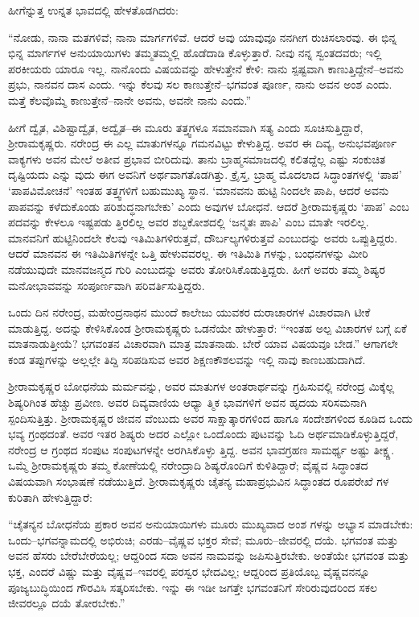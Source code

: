 ಹೀಗೆನ್ನುತ್ತ ಉನ್ನತ ಭಾವದಲ್ಲಿ ಹೇಳತೊಡಗಿದರು:

“ನೋಡು, ನಾನಾ ಮತಗಳಿವೆ; ನಾನಾ ಮಾರ್ಗಗಳಿವೆ. ಆದರೆ ಅವು ಯಾವುವೂ ನನಗೀಗ ರುಚಿಸಲಾರವು. ಈ ಭಿನ್ನ ಭಿನ್ನ ಮಾರ್ಗಗಳ ಅನುಯಾಯಿಗಳು ತಮ್ಮತಮ್ಮಲ್ಲಿ ಹೊಡೆದಾಡಿ ಕೊಳ್ಳುತ್ತಾರೆ. ನೀವು ನನ್ನ ಸ್ವಂತದವರು; ಇಲ್ಲಿ ಪರಕೀಯರು ಯಾರೂ ಇಲ್ಲ. ನಾನೊಂದು ವಿಷಯವನ್ನು ಹೇಳುತ್ತೇನೆ ಕೇಳಿ: ನಾನು ಸ್ಪಷ್ಟವಾಗಿ ಕಾಣುತ್ತಿದ್ದೇನೆ–ಅವನು ಪ್ರಭು, ನಾನವನ ದಾಸ ಎಂದು. ಇನ್ನು ಕೆಲವು ಸಲ ಕಾಣುತ್ತೇನೆ–ಭಗವಂತ ಪೂರ್ಣ, ನಾನು ಅವನ ಅಂಶ ಎಂದು. ಮತ್ತೆ ಕೆಲವೊಮ್ಮೆ ಕಾಣುತ್ತೇನೆ–ನಾನೇ ಅವನು, ಅವನೇ ನಾನು ಎಂದು.”

ಹೀಗೆ ದ್ವೈತ, ವಿಶಿಷ್ಟಾದ್ವೈತ, ಅದ್ವೈತ–ಈ ಮೂರು ತತ್ತ್ವಗಳೂ ಸಮಾನವಾಗಿ ಸತ್ಯ ಎಂದು ಸೂಚಿಸುತ್ತಿದ್ದಾರೆ, ಶ್ರೀರಾಮಕೃಷ್ಣರು. ನರೇಂದ್ರ ಈ ಎಲ್ಲ ಮಾತುಗಳನ್ನೂ ಗಮನವಿಟ್ಟು ಕೇಳುತ್ತಿದ್ದ. ಅವರ ಈ ದಿವ್ಯ, ಅನುಭವಪೂರ್ಣ ವಾಕ್ಯಗಳು ಅವನ ಮೇಲೆ ಅತೀವ ಪ್ರಭಾವ ಬೀರಿದುವು. ತಾನು ಬ್ರಾಹ್ಮಸಮಾಜದಲ್ಲಿ ಕಲಿತದ್ದೆಲ್ಲ ಎಷ್ಟು ಸಂಕುಚಿತ ದೃಷ್ಟಿಯದು ಎನ್ನು ವುದು ಈಗ ಅವನಿಗೆ ಅರ್ಥವಾಗತೊಡಗಿತ್ತು. ಕ್ರೈಸ್ತ, ಬ್ರಾಹ್ಮ ಮೊದಲಾದ ಸಿದ್ಧಾಂತಗಳಲ್ಲಿ ‘ಪಾಪ’ ‘ಪಾಪವಿಮೋಚನೆ’ ಇಂತಹ ತತ್ತ್ವಗಳಿಗೆ ಬಹುಮುಖ್ಯ ಸ್ಥಾನ. ‘ಮಾನವನು ಹುಟ್ಟಿ ನಿಂದಲೇ ಪಾಪಿ, ಆದರೆ ಅವನು ಪಾಪವನ್ನು ಕಳೆದುಕೊಂಡು ಪರಿಶುದ್ಧನಾಗಬೇಕು’ ಎಂದು ಅವುಗಳ ಬೋಧನೆ. ಆದರೆ ಶ್ರೀರಾಮಕೃಷ್ಣರು ‘ಪಾಪ’ ಎಂಬ ಪದವನ್ನು ಕೇಳಲೂ ಇಷ್ಟಪಡು ತ್ತಿರಲಿಲ್ಲ ಅವರ ಶಬ್ದಕೋಶದಲ್ಲಿ ‘ಜನ್ಮತಃ ಪಾಪಿ’ ಎಂಬ ಮಾತೇ ಇರಲಿಲ್ಲ. ಮಾನವನಿಗೆ ಹುಟ್ಟಿನಿಂದಲೇ ಕೆಲವು ಇತಿಮಿತಿಗಳಿರುತ್ತವೆ, ದೌರ್ಬಲ್ಯಗಳಿರುತ್ತವೆ ಎಂಬುದನ್ನು ಅವರು ಒಪ್ಪುತ್ತಿದ್ದರು. ಆದರೆ ಮಾನವನ ಈ ಇತಿಮಿತಿಗಳನ್ನೇ ಒತ್ತಿ ಹೇಳುವವರಲ್ಲ. ಈ ಇತಿಮಿತಿ ಗಳನ್ನು, ಬಂಧನಗಳನ್ನು ಮೀರಿ ನಡೆಯುವುದೇ ಮಾನವಜನ್ಮದ ಗುರಿ ಎಂಬುದನ್ನು ಅವರು ತೋರಿಸಿಕೊಡುತ್ತಿದ್ದರು. ಹೀಗೆ ಅವರು ತಮ್ಮ ಶಿಷ್ಯರ ಮನೋಭಾವವನ್ನು ಸಂಪೂರ್ಣವಾಗಿ ಪರಿವರ್ತಿಸುತ್ತಿದ್ದರು.

ಒಂದು ದಿನ ನರೇಂದ್ರ, ಮಹೇಂದ್ರನಾಥನ ಮುಂದೆ ಕಾಲೇಜು ಯುವಕರ ದುರಾಚಾರಗಳ ವಿಚಾರವಾಗಿ ಟೀಕೆ ಮಾಡುತ್ತಿದ್ದ. ಅದನ್ನು ಕೇಳಿಸಿಕೊಂಡ ಶ್ರೀರಾಮಕೃಷ್ಣರು ಒಡನೆಯೇ ಹೇಳುತ್ತಾರೆ: “ಇಂತಹ ಅಲ್ಪ ವಿಚಾರಗಳ ಬಗ್ಗೆ ಏಕೆ ಮಾತನಾಡುತ್ತೀಯೆ? ಭಗವಂತನ ವಿಚಾರವಾಗಿ ಮಾತ್ರ ಮಾತನಾಡು. ಬೇರೆ ಯಾವ ವಿಷಯವೂ ಬೇಡ.” ಆಗಾಗಲೇ ಕಂಡ ತಪ್ಪುಗಳನ್ನು ಅಲ್ಲಲ್ಲೇ ತಿದ್ದಿ ಸರಿಪಡಿಸುವ ಅವರ ಶಿಕ್ಷಣಕೌಶಲವನ್ನು ಇಲ್ಲಿ ನಾವು ಕಾಣಬಹುದಾಗಿದೆ.

ಶ್ರೀರಾಮಕೃಷ್ಣರ ಬೋಧನೆಯ ಮರ್ಮವನ್ನು, ಅವರ ಮಾತುಗಳ ಅಂತರಾರ್ಥವನ್ನು ಗ್ರಹಿಸುವಲ್ಲಿ ನರೇಂದ್ರ ಮಿಕ್ಕೆಲ್ಲ ಶಿಷ್ಯರಿಗಿಂತ ಹೆಚ್ಚು ಪ್ರವೀಣ. ಅವರ ದಿವ್ಯವಾಣಿಯ ಆಧ್ಯಾ ತ್ಮಿಕ ಭಾವಗಳಿಗೆ ಅವನ ಹೃದಯ ಸರಿಸಮನಾಗಿ ಸ್ಪಂದಿಸುತ್ತಿತ್ತು. ಶ್ರೀರಾಮಕೃಷ್ಣರ ಜೀವನ ವೆಂಬುದು ಅವರ ಸಾಕ್ಷಾತ್ಕಾರಗಳಿಂದ ಹಾಗೂ ಸಂದೇಶಗಳಿಂದ ಕೂಡಿದ ಒಂದು ಭವ್ಯ ಗ್ರಂಥದಂತೆ. ಅವರ ಇತರ ಶಿಷ್ಯರು ಅದರ ಎಲ್ಲೋ ಒಂದೊಂದು ಪುಟವನ್ನು ಓದಿ ಅರ್ಥಮಾಡಿಕೊಳ್ಳುತ್ತಿದ್ದರೆ, ನರೇಂದ್ರ ಆ ಗ್ರಂಥದ ಸಂಪುಟ ಸಂಪುಟಗಳನ್ನೇ ಅರಗಿಸಿಕೊಳ್ಳು ತ್ತಿದ್ದ. ಅವನ ಭಾವಗ್ರಹಣ ಸಾಮರ್ಥ್ಯ ಅಷ್ಟು ತೀಕ್ಷ್ಣ. ಒಮ್ಮೆ ಶ್ರೀರಾಮಕೃಷ್ಣರು ತಮ್ಮ ಕೋಣೆಯಲ್ಲಿ ನರೇಂದ್ರಾದಿ ಶಿಷ್ಯರೊಂದಿಗೆ ಕುಳಿತಿದ್ದಾರೆ; ವೈಷ್ಣವ ಸಿದ್ಧಾಂತದ ವಿಷಯವಾಗಿ ಸಂಭಾಷಣೆ ನಡೆಯುತ್ತಿದೆ. ಶ್ರೀರಾಮಕೃಷ್ಣರು ಚೈತನ್ಯ ಮಹಾಪ್ರಭುವಿನ ಸಿದ್ಧಾಂತದ ರೂಪರೇಖೆ ಗಳ ಕುರಿತಾಗಿ ಹೇಳುತ್ತಿದ್ದಾರೆ:

“ಚೈತನ್ಯನ ಬೋಧನೆಯ ಪ್ರಕಾರ ಅವನ ಅನುಯಾಯಿಗಳು ಮೂರು ಮುಖ್ಯವಾದ ಅಂಶ ಗಳನ್ನು ಅಭ್ಯಾಸ ಮಾಡಬೇಕು: ಒಂದು–ಭಗವನ್ನಾಮದಲ್ಲಿ ಅಭಿರುಚಿ; ಎರಡು–ವೈಷ್ಣವ ಭಕ್ತರ ಸೇವೆ; ಮೂರು–ಜೀವರಲ್ಲಿ ದಯೆ. ಭಗವಂತ ಮತ್ತು ಅವನ ಹೆಸರು ಬೇರೆಬೇರೆಯಲ್ಲ; ಆದ್ದರಿಂದ ಸದಾ ಅವನ ನಾಮವನ್ನು ಜಪಿಸುತ್ತಿರಬೇಕು. ಅಂತೆಯೇ ಭಗವಂತ ಮತ್ತು ಭಕ್ತ, ಎಂದರೆ ವಿಷ್ಣು ಮತ್ತು ವೈಷ್ಣವ–ಇವರಲ್ಲಿ ಪರಸ್ವರ ಭೇದವಿಲ್ಲ; ಆದ್ದರಿಂದ ಪ್ರತಿಯೊಬ್ಬ ವೈಷ್ಣವನನ್ನೂ ಪೂಜ್ಯಬುದ್ಧಿಯಿಂದ ಗೌರವಿಸಿ ಸತ್ಕರಿಸಬೇಕು. ಇನ್ನು ಈ ಇಡೀ ಜಗತ್ತೇ ಭಗವಂತನಿಗೆ ಸೇರಿರುವುದರಿಂದ ಸಕಲ ಜೀವರಲ್ಲೂ ದಯೆ ತೋರಬೇಕು.”

